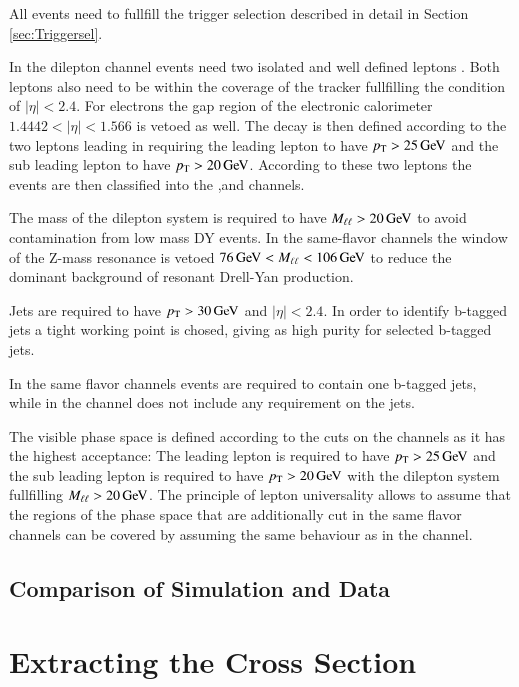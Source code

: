 All events need to fullfill the trigger selection described in detail in Section \ref{sec:Triggersel}.

In the dilepton channel events need two isolated and well defined leptons .
Both leptons also need to be within the coverage of the tracker fullfilling the condition of $|\eta| < 2.4$.
For electrons the gap region of the electronic calorimeter $1.4442<|\eta|<1.566$ is vetoed as well.
The decay is then defined according to the two leptons leading in \pt requiring the leading lepton to have $p_{\mathrm{T}} > 25 \,\text{Ge\hspace{-.08em}V}$
and the sub leading lepton to have $p_{\mathrm{T}} > 20 \,\text{Ge\hspace{-.08em}V}$. 
According to these two leptons the events are then classified into the \emu,\ee and \mumu channels.

The mass of the dilepton system is required to have $M_{\ell\ell} > 20 \,\text{Ge\hspace{-.08em}V}$ to avoid contamination from low mass DY events.
In the same-flavor channels the window of the Z-mass resonance is vetoed $76 \,\text{Ge\hspace{-.08em}V} < M_{\ell\ell} <106 \,\text{Ge\hspace{-.08em}V}$ to reduce the dominant background of 
resonant Drell-Yan production.

Jets are required to have $p_{\mathrm{T}} > 30 \,\text{Ge\hspace{-.08em}V}$ and $|\eta|<2.4$. In order to identify b-tagged jets a tight working point is chosed, giving as high 
purity for selected b-tagged jets.

In the same flavor channels events are required to contain one b-tagged jets, while in the \emu channel does not include any requirement on the jets.

The visible phase space is defined according to the cuts on the \emu channels as it has the highest acceptance:
The leading lepton is required to have $p_{\mathrm{T}} > 25 \,\text{Ge\hspace{-.08em}V}$ and the sub leading lepton is required to have $p_{\mathrm{T}} > 20 \,\text{Ge\hspace{-.08em}V}$ with the dilepton system
fullfilling $M_{\ell\ell} > 20 \,\text{Ge\hspace{-.08em}V}$. The principle of lepton universality allows to assume that the regions of the phase space that are additionally cut in the 
same flavor channels can be covered by assuming the same behaviour as in the \emu channel.



\subsection{Comparison of Simulation and Data}
\label{sec:xsec_datamc}

\section{Extracting the Cross Section}
\label{sec:xsec_fit}


